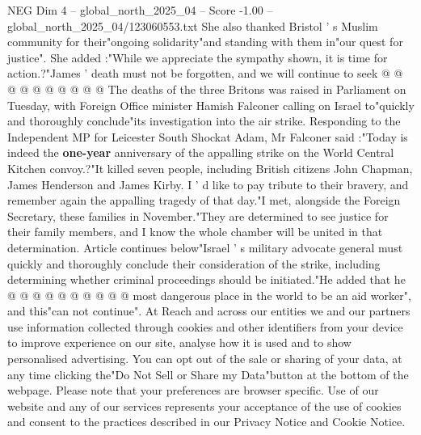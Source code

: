 \begin{textsample}{NEG Dim 4 – global\_north\_2025\_04 – Score -1.00 – global\_north\_2025\_04/123060553.txt}
She also thanked Bristol ' s Muslim community for their"ongoing solidarity"and standing with them in"our quest for justice".
She added :"While we appreciate the sympathy shown, it is time for action.?"James ' death must not be forgotten, and we will continue to seek @ @ @ @ @ @ @ @ @ @ The deaths of the three Britons was raised in Parliament on Tuesday, with Foreign Office minister Hamish Falconer calling on Israel to"quickly and thoroughly conclude"its investigation into the air strike.
Responding to the Independent MP for Leicester South Shockat Adam, Mr Falconer said :"Today is indeed the \textbf{one-year} anniversary of the appalling strike on the World Central Kitchen convoy.?"It killed seven people, including British citizens John Chapman, James Henderson and James Kirby.
I ' d like to pay tribute to their bravery, and remember again the appalling tragedy of that day."I met, alongside the Foreign Secretary, these families in November."They are determined to see justice for their family members, and I know the whole chamber will be united in that determination.
Article continues below"Israel ' s military advocate general must quickly and thoroughly conclude their consideration of the strike, including determining whether criminal proceedings should be initiated."He added that he @ @ @ @ @ @ @ @ @ @ most dangerous place in the world to be an aid worker", and this"can not continue".
At Reach and across our entities we and our partners use information collected through cookies and other identifiers from your device to improve experience on our site, analyse how it is used and to show personalised advertising.
You can opt out of the sale or sharing of your data, at any time clicking the"Do Not Sell or Share my Data"button at the bottom of the webpage.
Please note that your preferences are browser specific.
Use of our website and any of our services represents your acceptance of the use of cookies and consent to the practices described in our Privacy Notice and Cookie Notice.

\end{textsample}
